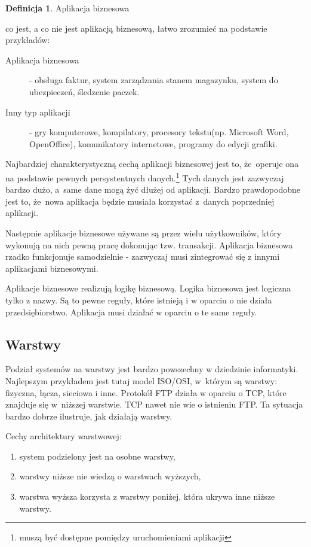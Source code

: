 \documentclass[a4paper,onecolumn,oneside,11pt,wide,floatssmall]{mwrep}
\theoremstyle{definition}
\newtheorem{defn}{Definicja}[section]
\theoremstyle{plain}%
\theoremstyle{remark}
\begin{document}
\begin{defn}{Aplikacja biznesowa}

co jest, a co nie jest aplikacją biznesową, łatwo zrozumieć na podstawie przykładów:
\begin{description}
  \item[Aplikacja biznesowa] - obsługa faktur, system zarządzania stanem magazynku, system do ubezpieczeń, śledzenie 
  paczek.
  \item[Inny typ aplikacji] - gry komputerowe, kompilatory, procesory tekstu(np. Microsoft Word, OpenOffice), 
  komunikatory internetowe, programy do edycji grafiki.
\end{description}
Najbardziej charakterystyczną cechą aplikacji biznesowej jest to, \mbox{że operuje} ona na podstawie pewnych persystentnych  
danych.\footnote{muszą być dostępne pomiędzy uruchomieniami aplikacji} Tych danych jest zazwyczaj bardzo dużo, \mbox{a same} 
dane mogą żyć dłużej od aplikacji. Bardzo prawdopodobne jest to, \mbox{że nowa} aplikacja będzie musiała korzystać \mbox{z danych} 
poprzedniej aplikacji.

Następnie aplikacje biznesowe używane są przez wielu użytkowników, który wykonują na nich pewną pracę dokonując tzw. 
transakcji. Aplikacja biznesowa rzadko funkcjonuje samodzielnie - zazwyczaj musi zintegrować się z innymi aplikacjami 
biznesowymi.

Aplikacje biznesowe realizują logikę biznesową. Logika biznesowa jest logiczna tylko z nazwy. Są to pewne reguły, 
które istnieją i w oparciu o nie działa przedsiębiorstwo. Aplikacja musi działać w oparciu o te same reguły.
\end{defn}

\subsection{Warstwy}
Podział systemów na warstwy jest bardzo powszechny w dziedzinie informatyki. Najlepszym przykładem jest tutaj model 
ISO/OSI, \mbox{w którym} są warstwy: fizyczna, łącza, sieciowa i inne. Protokół FTP działa w oparciu o TCP, które znajduje 
się \mbox{w niższej} warstwie. TCP nawet nie wie o istnieniu FTP. Ta sytuacja bardzo dobrze ilustruje, jak działają warstwy.

Cechy architektury warstwowej:
\begin{enumerate}
  \item system podzielony jest na osobne warstwy,
  \item warstwy niższe nie wiedzą o warstwach wyższych,
  \item warstwa wyższa korzysta z warstwy poniżej, która ukrywa inne niższe warstwy.
\end{enumerate}
\end{document}
